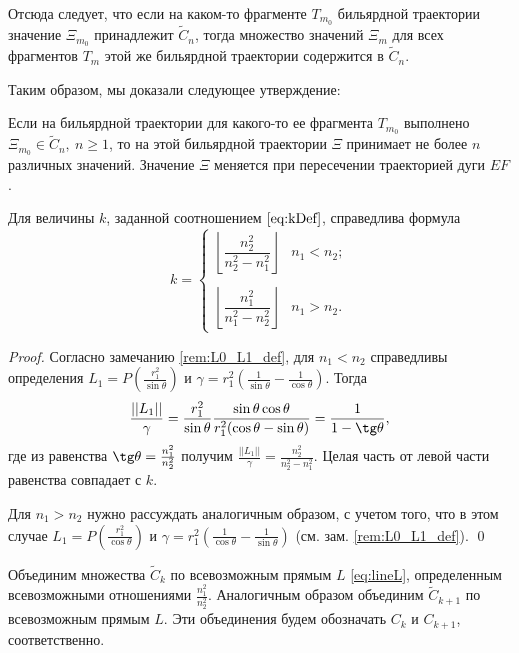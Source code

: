 Отсюда следует, что если на каком-то  фрагменте $T_{m_0}$ бильярдной траектории  значение $\Xi_{m_0}$ принадлежит $\widetilde{C}_n$, тогда множество значений $\Xi_m$ для всех фрагментов $T_m$ этой же бильярдной траектории содержится в $\widetilde{C}_n$.

Таким образом, мы доказали следующее утверждение:
\begin{statement}
Если на  бильярдной траектории для какого-то ее фрагмента $T_{m_0}$  выполнено $\Xi_{m_0} \in \widetilde{C}_n, \ n\geq 1$, то на этой бильярдной траектории  $\Xi$ принимает не более $n$ различных значений. Значение $\Xi$ меняется при пересечении траекторией дуги $EF$.
\end{statement}

\begin{statement}
Для величины $k$, заданной соотношением $\eqref{eq:kDef}$, справедлива формула 
\[
k=\left\{
\begin{array}{ll}
\left\lfloor \dfrac{n_2^2}{n_2^2-n_1^2} \right\rfloor & n_1<n_2; \\
\\
\left\lfloor \dfrac{n_1^2}{n_1^2-n_2^2} \right\rfloor & n_1>n_2.
\end{array}
\right.
\]
\end{statement}
\begin{proof}
Согласно замечанию \ref{rem:L0_L1_def}, для $n_1<n_2$ справедливы определения $L_1 = P(\frac{r_1^2}{\sin \theta})$ и $\gamma = r_1^2 \left( \frac{1}{\sin \theta} - \frac{1}{\cos \theta}  \right)$.
Тогда 
$$\frac{||L_1||}{\gamma} = \frac{r_1^2}{\sin \theta} \frac{\sin \theta \cos \theta}{r_1^2 (\cos \theta - \sin \theta)} = \frac{1}{1-\tg \theta},$$
где из равенства $\tg \theta = \frac{n_1^2}{n_2^2}$ получим $\frac{||L_1||}{\gamma} = \frac{n_2^2}{n_2^2-n_1^2}$. Целая часть от левой части равенства совпадает с $k$.

Для $n_1>n_2$ нужно рассуждать аналогичным образом, с учетом того, что в этом случае $L_1 = P(\frac{r_1^2}{\cos \theta})$ и $\gamma = r_1^2 \left( \frac{1}{\cos \theta} - \frac{1}{\sin \theta}  \right)$ (см. зам. \ref{rem:L0_L1_def}).
\qed
\end{proof}

Объединим множества $\widetilde{C}_k$ по всевозможным прямым $L$ \eqref{eq:lineL}, определенным всевозможными отношениями $\frac{n_1^2}{n_2^2}$. Аналогичным образом объединим $\widetilde{C}_{k+1}$ по всевозможным прямым $L$. Эти объединения будем обозначать $C_k$ и $C_{k+1}$, соответственно.


